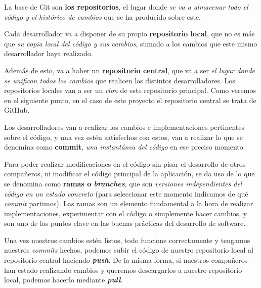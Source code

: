 La base de Git son \textbf{los repositorios}, el lugar donde \textit{se va a almacenar todo el código y el histórico de cambios} que se ha producido sobre este. 

Cada desarrollador va a disponer de su propio \textbf{repositorio local}, que no es más que \textit{su copia local del código y sus cambios}, sumado a los cambios que este mismo desarrollador haya realizado. 

Además de esto, va a haber un \textbf{repositorio central}, que va a ser \textit{el lugar donde se unifican todos los cambios} que realicen los distintos desarrolladores. Los repositorios locales van a ser un \textit{clon} de este repositorio principal. Como veremos en el siguiente punto, en el caso de este proyecto el repositorio central se trata de GitHub.


Los desarrolladores van a realizar los cambios e implementaciones pertinentes sobre el código, y una vez estén satisfechos con estos, van a realizar lo que se denomina como \textbf{commit}, \textit{una instantánea del código} en ese preciso momento.


Para poder realizar modificaciones en el código sin pisar el desarrollo de otros compañeros, ni modificar el código principal de la aplicación, se da uso de lo que se denomina como \textbf{ramas o \textit{branches}}, que son \textit{versiones independientes del código en un estado concreto} (para seleccionar este momento indicamos de qué \textit{commit} partimos). Las ramas son un elemento fundamental a la hora de realizar implementaciones, experimentar con el código o simplemente hacer cambios, y son uno de los puntos clave en las buenas prácticas del desarrollo de software.


Una vez nuestros cambios estén listos, todo funcione correctamente y tengamos nuestros \textit{commits} hechos, podemos subir el código de nuestro repositorio local al repositorio central haciendo \textit{\textbf{push}}. De la misma forma, si nuestros compañeros han estado realizando cambios y queremos descargarlos a nuestro repositorio local, podemos hacerlo mediante \textit{\textbf{pull}}.

